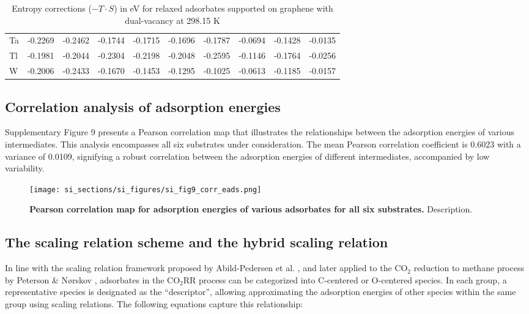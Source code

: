 \begin{table}[h]
{\begin{tabular}{*{10}{l}}
      Ta & -0.2269 & -0.2462 & -0.1744 & -0.1715 & -0.1696 & -0.1787 & -0.0694 & -0.1428 & -0.0135 \\
      Tl & -0.1981 & -0.2044 & -0.2304 & -0.2198 & -0.2048 & -0.2595 & -0.1146 & -0.1764 & -0.0256 \\
      W  & -0.2006 & -0.2433 & -0.1670 & -0.1453 & -0.1295 & -0.1025 & -0.0613 & -0.1185 & -0.0157 \\
      \hline
  \end{tabular}
  }
  \caption{Entropy corrections ($-T \cdot S$) in eV for relaxed adsorbates supported on graphene with dual-vacancy at 298.15 K}
  \label{si_table12:s_vac_gra}
\end{table}


\subsection{Correlation analysis of adsorption energies}


Supplementary Figure 9 presents a Pearson correlation map that illustrates the relationships between the adsorption energies of various intermediates. This analysis encompasses all six substrates under consideration. The mean Pearson correlation coefficient is 0.6023 with a variance of 0.0109, signifying a robust correlation between the adsorption energies of different intermediates, accompanied by low variability.

\begin{figure}
  \centering
  \texttt{[image: si\_sections/si\_figures/si\_fig9\_corr\_eads.png]}
  \caption{\textbf{Pearson correlation map for adsorption energies of various adsorbates for all six substrates.}
  Description.}
  \label{si_fig9:corr_eads}
\end{figure}


\subsection{The scaling relation scheme and the hybrid scaling relation}


In line with the scaling relation framework proposed by Abild-Pedersen et al. \cite{abild2007scaling},
and later applied to the CO$_2$ reduction to methane process by Peterson \& Nørskov \cite{peterson2012activity},
adsorbates in the CO$_2$RR process can be categorized into C-centered or O-centered species.
In each group, a representative species is designated as the “descriptor”, allowing approximating the adsorption energies of other species within the same group using scaling relations.
The following equations capture this relationship:

